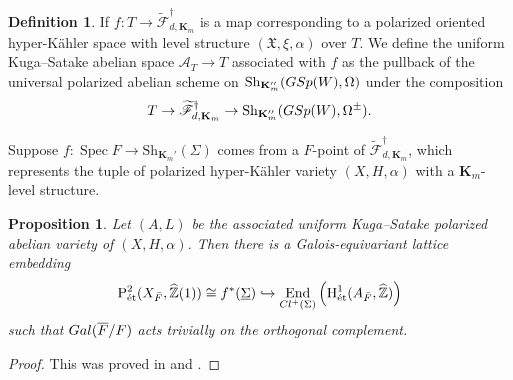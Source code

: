 \documentclass[11pt,reqno,oneside]{amsart}
\numberwithin{equation}{section}
\newtheorem{proposition}[theorem]{Proposition}
\theoremstyle{definition}
\newtheorem{definition}[theorem]{Definition}
\DeclareMathOperator{\Spec}{Spec}
\DeclareMathOperator{\End}{End}
\newcommand{\Cl}{{\rm Cl}}
\newcommand{\Gal}{{\rm Gal}}
\DeclareMathOperator{\et}{\Acute{e}t}
\newcommand{\GSp}{{\rm GSp}}
\newcommand{\Sh}{\mathrm{Sh}}
\newcommand{\scF}{\mathscr{F}}
\newcommand\rH{\mathrm{H}}
\newcommand\rP{\mathrm{P}}
\newcommand{\ZZ}{\mathbb{Z}}
\newcommand{\fX}{\mathfrak{X}}
\begin{document}
\begin{definition}  
If $f \colon T \rightarrow \widetilde{\scF}_{d,\mathbf{K}_m}^{\dag}$ is a map corresponding to a polarized oriented hyper-Kähler space with level structure $(\fX, \xi,\alpha)$ over $T$. We define the uniform Kuga--Satake abelian space $\mathcal{A}_T \rightarrow T$ associated with $f$ as the pullback of the universal polarized abelian scheme on $\Sh_{\mathbf{K}''_m}(\GSp(W), \Omega)$ under the composition 
\begin{equation}
T \rightarrow  \widetilde{\scF}_{d,\mathbf{K}_{m}}^{\dag}\rightarrow \Sh_{\mathbf{K}''_m}(\GSp(W), \Omega^{\pm}).
\end{equation}

\end{definition}
Suppose $f\colon \Spec F \rightarrow \Sh_{\mathbf{K}_{m}'}(\Sigma)$ comes from a $F$-point  of $\widetilde{\scF}_{d,\mathbf{K}_{m}}^{\dag}$, which represents  the tuple of polarized hyper-Kähler variety $(X, H, \alpha)$ with a $\mathbf{K}_{m}$-level structure. 
\begin{proposition}\label{propertyofks}
Let  $(A, L)$ be the associated uniform Kuga--Satake polarized abelian variety of $(X,H,\alpha)$. Then there is a Galois-equivariant lattice  embedding
$$\rP^2_{\et}(X_{\bar{F}},\widehat{\ZZ}(1))\cong f^\ast (\underline{\Sigma})\hookrightarrow \End_{\Cl^+(\Sigma)}\left(\rH^1_{\et}(A_{\bar{F}}, \widehat{\ZZ})\right) $$
such that $\Gal(\overline{F}/F)$ acts trivially on the orthogonal complement.
\end{proposition}
\begin{proof}
This was proved in \cite{Pe15} and \cite{Sh17}. 
\end{proof}
\end{document}
